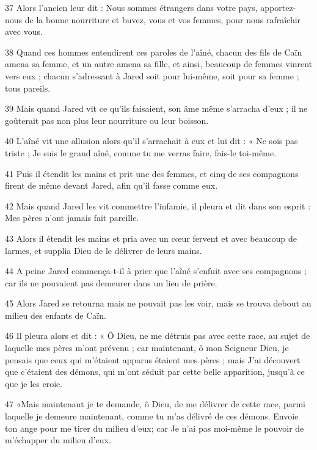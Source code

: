 \par 37 Alors l'ancien leur dit : Nous sommes étrangers dans votre pays, apportez-nous de la bonne nourriture et buvez, vous et vos femmes, pour nous rafraîchir avec vous.

\par 38 Quand ces hommes entendirent ces paroles de l'aîné, chacun des fils de Caïn amena sa femme, et un autre amena sa fille, et ainsi, beaucoup de femmes vinrent vers eux ; chacun s'adressant à Jared soit pour lui-même, soit pour sa femme ; tous pareils.

\par 39 Mais quand Jared vit ce qu'ils faisaient, son âme même s'arracha d'eux ; il ne goûterait pas non plus leur nourriture ou leur boisson.

\par 40 L'aîné vit une allusion alors qu'il s'arrachait à eux et lui dit : « Ne sois pas triste ; Je suis le grand aîné, comme tu me verras faire, fais-le toi-même.

\par 41 Puis il étendit les mains et prit une des femmes, et cinq de ses compagnons firent de même devant Jared, afin qu'il fasse comme eux.

\par 42 Mais quand Jared les vit commettre l'infamie, il pleura et dit dans son esprit : Mes pères n'ont jamais fait pareille.

\par 43 Alors il étendit les mains et pria avec un cœur fervent et avec beaucoup de larmes, et supplia Dieu de le délivrer de leurs mains.

\par 44 A peine Jared commença-t-il à prier que l'aîné s'enfuit avec ses compagnons ; car ils ne pouvaient pas demeurer dans un lieu de prière.

\par 45 Alors Jared se retourna mais ne pouvait pas les voir, mais se trouva debout au milieu des enfants de Caïn.

\par 46 Il pleura alors et dit : « Ô Dieu, ne me détruis pas avec cette race, au sujet de laquelle mes pères m'ont prévenu ; car maintenant, ô mon Seigneur Dieu, je pensais que ceux qui m'étaient apparus étaient mes pères ; mais J'ai découvert que c'étaient des démons, qui m'ont séduit par cette belle apparition, jusqu'à ce que je les croie.

\par 47 «Mais maintenant je te demande, ô Dieu, de me délivrer de cette race, parmi laquelle je demeure maintenant, comme tu m'as délivré de ces démons. Envoie ton ange pour me tirer du milieu d'eux; car Je n'ai pas moi-même le pouvoir de m'échapper du milieu d'eux.

